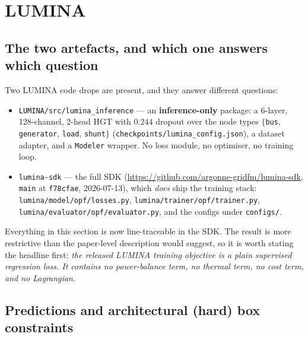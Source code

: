 \documentclass[11pt]{article}
\newcommand{\code}[1]{\texttt{\small #1}}
\begin{document}
\section{LUMINA}
\label{sec:lumina}

\subsection{The two artefacts, and which one answers which question}

Two LUMINA code drops are present, and they answer different questions:
\begin{itemize}
\item \code{LUMINA/src/lumina\_inference} --- an \textbf{inference-only} package: a 6-layer,
      128-channel, 2-head HGT with $0.244$ dropout over the node types $\{$\code{bus},
      \code{generator}, \code{load}, \code{shunt}$\}$ (\code{checkpoints/lumina\_config.json}),
      a dataset adapter, and a \code{Modeler} wrapper. No loss module, no optimiser, no
      training loop.
\item \code{lumina-sdk} --- the full SDK
      (\url{https://github.com/argonne-gridfm/lumina-sdk}, \code{main} at \code{f78cfae},
      2026-07-13), which \emph{does} ship the training stack: \code{lumina/model/opf/losses.py},
      \code{lumina/trainer/opf/trainer.py}, \code{lumina/evaluator/opf/evaluator.py}, and the
      configs under \code{configs/}.
\end{itemize}
Everything in this section is now line-traceable in the SDK. The result is more restrictive
than the paper-level description would suggest, so it is worth stating the headline first:
\emph{the released LUMINA training objective is a plain supervised regression loss. It
contains no power-balance term, no thermal term, no cost term, and no Lagrangian.}

\subsection{Predictions and architectural (hard) box constraints}
\end{document}
